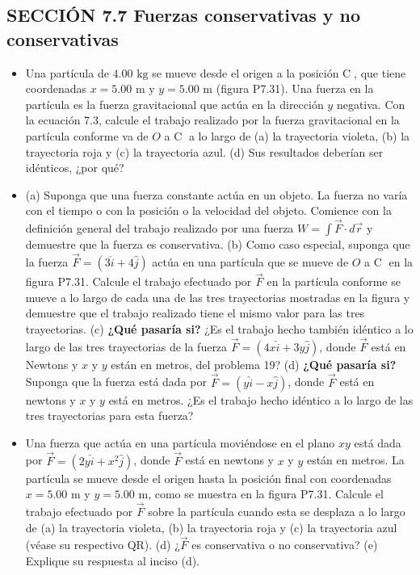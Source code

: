 \documentclass[11pt,a4paper]{article}
\begin{document}
\subsection*{SECCIÓN 7.7 Fuerzas conservativas y no conservativas}

\begin{itemize}
    \item[\textbf{31.}] Una partícula de $4.00 \text{ kg}$ se mueve desde el origen a la posición \textcircled{C}, que tiene coordenadas $x = 5.00 \text{ m}$ y $y = 5.00 \text{ m}$ (figura P7.31). Una fuerza en la partícula es la fuerza gravitacional que actúa en la dirección $y$ negativa. Con la ecuación 7.3, calcule el trabajo realizado por la fuerza gravitacional en la partícula conforme va de $O$ a \textcircled{C} a lo largo de (a) la trayectoria violeta, (b) la trayectoria roja y (c) la trayectoria azul. (d) Sus resultados deberían ser idénticos, ¿por qué?
    \vspace*{6cm}

    \item[\textbf{32.}] (a) Suponga que una fuerza constante actúa en un objeto. La fuerza no varía con el tiempo o con la posición o la velocidad del objeto. Comience con la definición general del trabajo realizado por una fuerza $W = \int \vec{F} \cdot d\vec{r}$ y demuestre que la fuerza es conservativa. (b) Como caso especial, suponga que la fuerza $\vec{F} = (3\hat{i} + 4\hat{j})$ actúa en una partícula que se mueve de $O$ a \textcircled{C} en la figura P7.31. Calcule el trabajo efectuado por $\vec{F}$ en la partícula conforme se mueve a lo largo de cada una de las tres trayectorias mostradas en la figura y demuestre que el trabajo realizado tiene el mismo valor para las tres trayectorias. (c) \textbf{¿Qué pasaría si?} ¿Es el trabajo hecho también idéntico a lo largo de las tres trayectorias de la fuerza $\vec{F} = (4x\hat{i} + 3y\hat{j})$, donde $\vec{F}$ está en Newtons y $x$ y $y$ están en metros, del problema 19? (d) \textbf{¿Qué pasaría si?} Suponga que la fuerza está dada por $\vec{F} = (y\hat{i} - x\hat{j})$, donde $\vec{F}$ está en newtons y $x$ y $y$ está en metros. ¿Es el trabajo hecho idéntico a lo largo de las tres trayectorias para esta fuerza?
    \vspace*{8cm}
\end{itemize}

\newpage

\begin{itemize}
    \item[\textbf{33.}] Una fuerza que actúa en una partícula moviéndose en el plano $xy$ está dada por $\vec{F} = (2y\hat{i} + x^2\hat{j})$, donde $\vec{F}$ está en newtons y $x$ y $y$ están en metros. La partícula se mueve desde el origen hasta la posición final con coordenadas $x = 5.00 \text{ m}$ y $y = 5.00 \text{ m}$, como se muestra en la figura P7.31. Calcule el trabajo efectuado por $\vec{F}$ sobre la partícula cuando esta se desplaza a lo largo de (a) la trayectoria violeta, (b) la trayectoria roja y (c) la trayectoria azul (véase su respectivo QR). (d) ¿$\vec{F}$ es conservativa o no conservativa? (e) Explique su respuesta al inciso (d).
    \vspace*{8cm}
\end{itemize}
\end{document}
